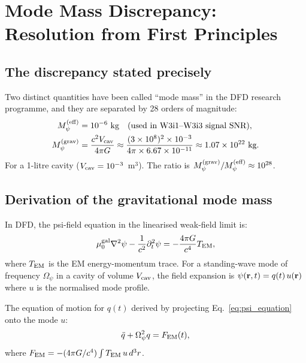 \documentclass[11pt,twocolumn]{article}
\newcommand{\Opsi}{\Omega_\psi}
\newcommand{\Mpsi}{M_\psi}
\newcommand{\ee}[1]{\times 10^{#1}}
\newcommand{\VcavSym}{V_{\rm cav}}
\theoremstyle{definition}
\theoremstyle{remark}
\begin{document}
\section{Mode Mass Discrepancy: Resolution from First Principles}
\label{sec:mode_mass}

\subsection{The discrepancy stated precisely}
\label{sec:discrepancy_statement}

Two distinct quantities have been called ``mode mass'' in the DFD research
programme, and they are separated by 28 orders of magnitude:
\begin{align}
\Mpsi^{(\rm eff)} &= 10^{-6}~\text{kg} \quad\text{(used in W3i1--W3i3 signal SNR)},
\label{eq:Mpsi_eff}\\
\Mpsi^{(\rm grav)} &= \frac{c^2 \VcavSym}{4\pi G}
\approx \frac{(3\ee{8})^2 \times 10^{-3}}{4\pi\times6.67\ee{-11}}
\approx 1.07\ee{22}~\text{kg.}
\label{eq:Mpsi_grav}
\end{align}
For a 1-litre cavity ($\VcavSym = 10^{-3}$~m$^3$). The ratio is
$\Mpsi^{(\rm grav)}/\Mpsi^{(\rm eff)} \approx 10^{28}$.

\subsection{Derivation of the gravitational mode mass}
\label{sec:grav_mass_derivation}

In DFD, the psi-field equation in the linearised weak-field limit is:
\begin{equation}
\mu_0^{\rm gal}\nabla^2\psi - \frac{1}{c^2}\partial_t^2\psi
= -\frac{4\pi G}{c^4}T_{\rm EM},
\label{eq:psi_equation}
\end{equation}
where $T_{\rm EM}$ is the EM energy-momentum trace.
For a standing-wave mode of frequency $\Opsi$ in a cavity of volume $\VcavSym$,
the field expansion is $\psi({\bf r},t) = q(t)\,u({\bf r})$ where $u$ is
the normalised mode profile.

The equation of motion for $q(t)$ derived by projecting Eq.~\eqref{eq:psi_equation}
onto the mode $u$:
\begin{equation}
\ddot{q} + \Opsi^2 q = F_{\rm EM}(t),
\label{eq:EOM_q}
\end{equation}
where $F_{\rm EM} = -(4\pi G/c^4)\int T_{\rm EM}\,u\,d^3r$.
\end{document}
